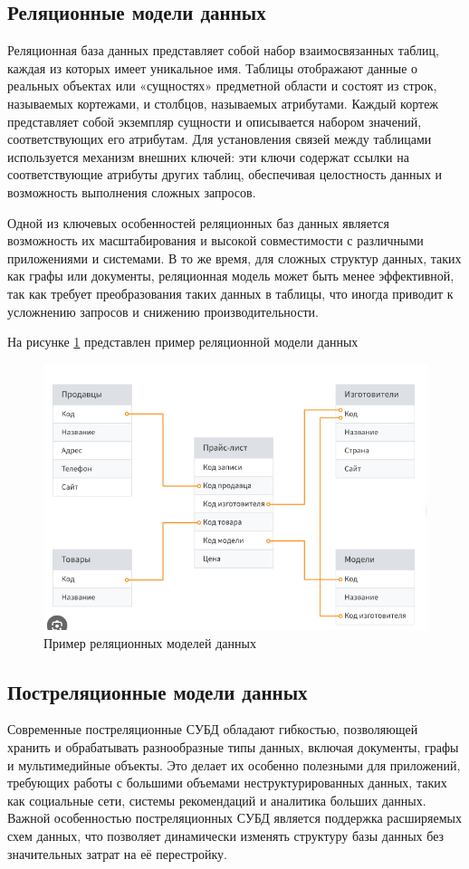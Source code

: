 \subsection{Реляционные модели данных}

Реляционная база данных представляет собой набор взаимосвязанных таблиц, каждая из которых имеет уникальное имя. Таблицы отображают данные о реальных объектах или «сущностях» предметной области и состоят из строк, называемых кортежами, и столбцов, называемых атрибутами. Каждый кортеж представляет собой экземпляр сущности и описывается набором значений, соответствующих его атрибутам. Для установления связей между таблицами используется механизм внешних ключей: эти ключи содержат ссылки на соответствующие атрибуты других таблиц, обеспечивая целостность данных и возможность выполнения сложных запросов. \cite{csharp}

Одной из ключевых особенностей реляционных баз данных является возможность их масштабирования и высокой совместимости с различными приложениями и системами. В то же время, для сложных структур данных, таких как графы или документы, реляционная модель может быть менее эффективной, так как требует преобразования таких данных в таблицы, что иногда приводит к усложнению запросов и снижению производительности.

На рисунке \ref{img:3_model} представлен пример реляционной модели данных
\begin{figure}[ht!]
	\centering
	\includegraphics[width=0.55\linewidth]{img/4.png}
	\caption{Пример реляционных моделей данных}
	\label{img:3_model}
\end{figure}

\subsection{Постреляционные модели данных}
Современные постреляционные СУБД обладают гибкостью, позволяющей хранить и обрабатывать разнообразные типы данных, включая документы, графы и мультимедийные объекты. Это делает их особенно полезными для приложений, требующих работы с большими объемами неструктурированных данных, таких как социальные сети, системы рекомендаций и аналитика больших данных. Важной особенностью постреляционных СУБД является поддержка расширяемых схем данных, что позволяет динамически изменять структуру базы данных без значительных затрат на её перестройку.

